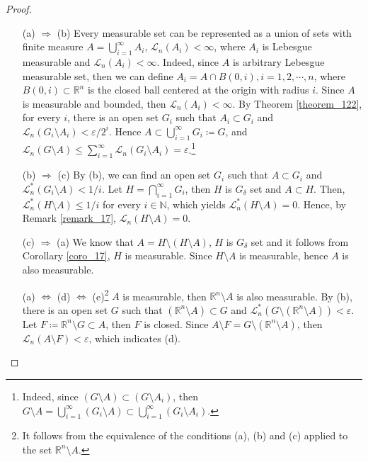 \documentclass[11pt]{book}
\theoremstyle{definition}
\numberwithin{equation}{chapter}
\def\L{{\mathcal L}}
\begin{document}
\begin{proof}
~\begin{enumerate}
    \item[(a)]$\Rightarrow$ (b) Every measurable set can be represented as a union of sets with finite measure $A = \bigcup^\infty_{i=1}A_i$, $\L_n(A_i) < \infty$, where $A_i$ is Lebesgue measurable and $\L_n(A_i) < \infty$. Indeed, since $A$ is arbitrary Lebesgue measurable set, then we can define $A_i = A \cap B(0,i), i = 1,2,\cdots,n$, where $B(0,i) \subset \mathbb{R}^n$ is the closed ball centered at the origin with radius $i$. Since $A$ is measurable and bounded, then $\L_n(A_i) < \infty$. By Theorem \ref{theorem_122}, for every $i$, there is an open set $G_i$ such that $A_i \subset G_i$ and $\L_n(G_i\setminus A_i) < \varepsilon / 2^i$. Hence $A \subset \bigcup^\infty_{i=1} G_i \coloneqq G$, and $\L_n(G \setminus A) \leq \sum^\infty_{i=1} \L_n(G_i \setminus A_i) = \varepsilon$.\footnote{Indeed, since $(G \setminus A) \subset (G \setminus A_i)$, then $G \setminus A = \bigcup^\infty_{i=1} (G_i \setminus A) \subset \bigcup^\infty_{i=1} (G_i \setminus A_i).$}
    
    \item[(b)]$\Rightarrow$ (c) By (b), we can find an open set $G_i$ such that $A \subset G_i$ and $\L_n^*(G_i\setminus A) < 1/i$. Let $H = \bigcap^\infty_{i=1} G_i$, then $H$ is $G_\delta$ set and $A \subset H$. Then, $\L_n^*(H\setminus A) \leq 1/i$ for every $i \in \mathbb{N}$, which yields $\L_n^*(H\setminus A) = 0$. Hence, by Remark \ref{remark_17}, $\L_n(H \setminus A) = 0$.
    
    \item[(c)]$\Rightarrow$ (a) We know that $A = H \setminus (H \setminus A)$, $H$ is $G_\delta$ set and it follows from Corollary \ref{coro_17}, $H$ is measurable. Since $H \setminus A$ is measurable, hence $A$ is also measurable.
    
    \item[(a)] $\Leftrightarrow	$ (d) $\Leftrightarrow$ (e)\footnote{It follows from the equivalence of the conditions (a), (b) and (c) applied to the set $\mathbb{R}^n\setminus A$.} $A$ is measurable, then $\mathbb{R}^n \setminus A$ is also measurable. By (b), there is an open set $G$ such that $(\mathbb{R}^n \setminus A) \subset G$ and $\L_n^*(G \setminus (\mathbb{R}^n \setminus A)) < \varepsilon$. Let $F \coloneqq \mathbb{R}^n \setminus G \subset A$, then $F$ is closed. Since $A \setminus F = G \setminus (\mathbb{R}^n \setminus A)$, then $\L_n(A \setminus F) < \varepsilon$, which indicates (d).
    

\end{enumerate}
\end{proof}
\end{document}
